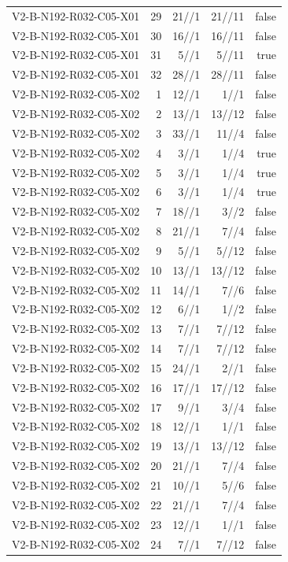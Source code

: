 {\begin{longtable}{lrrrr}
V2-B-N192-R032-C05-X01 & 29 & 21//1 & 21//11 & false \\
V2-B-N192-R032-C05-X01 & 30 & 16//1 & 16//11 & false \\
V2-B-N192-R032-C05-X01 & 31 & 5//1 & 5//11 & true \\
V2-B-N192-R032-C05-X01 & 32 & 28//1 & 28//11 & false \\
V2-B-N192-R032-C05-X02 & 1 & 12//1 & 1//1 & false \\
V2-B-N192-R032-C05-X02 & 2 & 13//1 & 13//12 & false \\
V2-B-N192-R032-C05-X02 & 3 & 33//1 & 11//4 & false \\
V2-B-N192-R032-C05-X02 & 4 & 3//1 & 1//4 & true \\
V2-B-N192-R032-C05-X02 & 5 & 3//1 & 1//4 & true \\
V2-B-N192-R032-C05-X02 & 6 & 3//1 & 1//4 & true \\
V2-B-N192-R032-C05-X02 & 7 & 18//1 & 3//2 & false \\
V2-B-N192-R032-C05-X02 & 8 & 21//1 & 7//4 & false \\
V2-B-N192-R032-C05-X02 & 9 & 5//1 & 5//12 & false \\
V2-B-N192-R032-C05-X02 & 10 & 13//1 & 13//12 & false \\
V2-B-N192-R032-C05-X02 & 11 & 14//1 & 7//6 & false \\
V2-B-N192-R032-C05-X02 & 12 & 6//1 & 1//2 & false \\
V2-B-N192-R032-C05-X02 & 13 & 7//1 & 7//12 & false \\
V2-B-N192-R032-C05-X02 & 14 & 7//1 & 7//12 & false \\
V2-B-N192-R032-C05-X02 & 15 & 24//1 & 2//1 & false \\
V2-B-N192-R032-C05-X02 & 16 & 17//1 & 17//12 & false \\
V2-B-N192-R032-C05-X02 & 17 & 9//1 & 3//4 & false \\
V2-B-N192-R032-C05-X02 & 18 & 12//1 & 1//1 & false \\
V2-B-N192-R032-C05-X02 & 19 & 13//1 & 13//12 & false \\
V2-B-N192-R032-C05-X02 & 20 & 21//1 & 7//4 & false \\
V2-B-N192-R032-C05-X02 & 21 & 10//1 & 5//6 & false \\
V2-B-N192-R032-C05-X02 & 22 & 21//1 & 7//4 & false \\
V2-B-N192-R032-C05-X02 & 23 & 12//1 & 1//1 & false \\
V2-B-N192-R032-C05-X02 & 24 & 7//1 & 7//12 & false \\

\end{longtable}}
